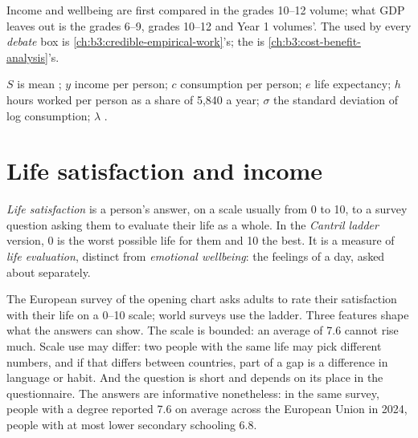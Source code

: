 \begin{recall}
Income and wellbeing are first compared in the grades 10--12 volume; what GDP leaves
out is the grades 6--9, grades 10--12 and Year 1 volumes'. The  used by
every \emph{debate} box is \cref{ch:b3:credible-empirical-work}'s; the  is \cref{ch:b3:cost-benefit-analysis}'s.
\end{recall}

\begin{notation}\label{not:b3:income-and-wellbeing-evidence:symbols}
$S$ is mean ; $y$ income per person; $c$ consumption per person; $e$ life
expectancy; $h$ hours worked per person as a share of 5{,}840 a year; $\sigma$ the standard
deviation of log consumption; $\lambda$ .
\end{notation}

\section{Life satisfaction and income}\label{sec:b3:income-and-wellbeing-evidence:satisfaction}

\begin{definition}\label{def:b3:income-and-wellbeing-evidence:life-satisfaction}
\emph{Life satisfaction} is a person's answer, on a scale usually from 0 to 10, to a
survey question asking them to evaluate their life as a whole. In the \emph{Cantril
ladder} version, 0 is the worst possible life for them and 10 the best. It is a
measure of \emph{life evaluation}, distinct from \emph{emotional wellbeing}: the
feelings of a day, asked about separately.
\end{definition}

\begin{measure}
The European survey of the opening chart asks adults to rate their satisfaction
with their life on a 0--10 scale; world surveys use the ladder. Three features shape
what the answers can show. The scale is bounded: an average of 7.6 cannot rise
much. Scale use may differ: two people with the same life may pick different numbers,
and if that differs between countries, part of a gap is a difference in language or
habit. And the question is short and depends on its place in the questionnaire. The
answers are informative nonetheless: in the same survey, people with a degree reported
7.6 on average across the European Union in 2024, people with at most lower secondary schooling 6.8.
\end{measure}

